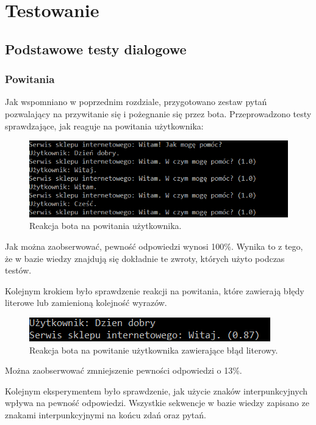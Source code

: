 \chapter{Testowanie}
\section{Podstawowe testy dialogowe}
\subsection{Powitania}
Jak wspomniano w poprzednim rozdziale, przygotowano zestaw pytań pozwalający na przywitanie się i pożegnanie się przez bota. Przeprowadzono testy sprawdzające, jak reaguje na powitania użytkownika:

\begin{figure}[ht]
	{\centering
		\includegraphics[width=0.9\linewidth]{rys/rys03/1}
	\caption{Reakcja bota na powitania użytkownika.}
	}
	\label{fig:bot4}
\end{figure}

Jak można zaobserwować, pewność odpowiedzi wynosi 100\%. Wynika to z tego, że w bazie wiedzy znajdują się dokładnie te zwroty, których użyto podczas testów.

Kolejnym krokiem było sprawdzenie reakcji na powitania, które zawierają błędy literowe lub zamienioną kolejność wyrazów.

\newpage

\begin{figure}[ht]
	{\centering
		\includegraphics[width=0.9\linewidth]{rys/rys03/2}
	\caption{Reakcja bota na powitanie użytkownika zawierające błąd literowy.}
	}
	\label{fig:bot4}
\end{figure}

Można zaobserwować zmniejszenie pewności odpowiedzi o 13\%.

Kolejnym eksperymentem było sprawdzenie, jak użycie znaków interpunkcyjnych wpływa na pewność odpowiedzi. Wszystkie sekwencje w bazie wiedzy zapisano ze znakami interpunkcyjnymi na końcu zdań oraz pytań. 


